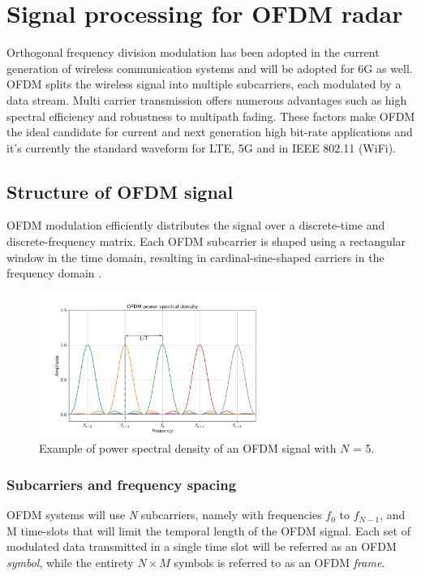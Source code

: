 \chapter{Signal processing for OFDM radar}
\label{chap:theoretical_OFDM}

Orthogonal frequency division modulation has been adopted in the current generation of wireless communication systems and will be adopted for 6G as well.
OFDM splits the wireless signal into multiple subcarriers, each modulated by a data stream. Multi carrier transmission offers numerous advantages such as high spectral efficiency and robustness to multipath fading. These factors make OFDM the ideal candidate for current and next generation high bit-rate applications and it's currently the standard waveform for LTE, 5G and in IEEE 802.11 (WiFi).

\section{Structure of OFDM signal}

OFDM modulation efficiently distributes the signal over a discrete-time and discrete-frequency matrix. Each OFDM subcarrier is shaped using a rectangular window in the time domain, resulting in cardinal-sine-shaped carriers in the frequency domain \cite{Schaich_Wild_2014}.

\begin{figure}[H]
    \centering
    \includegraphics[width=0.7\textwidth]{Images/theoretical/ofdm/ofdm_psd_mod.png}
    \caption{Example of power spectral density of an OFDM signal with $N$ = 5.}
    \label{fig:quadtree}
\end{figure}

\subsection{Subcarriers and frequency spacing}
OFDM systems will use \textit{N} subcarriers, namely with frequencies $f_0$ to $f_{N-1}$, and M time-slots that will limit the temporal length of the OFDM signal.
Each set of modulated data transmitted in a single time slot will be referred as an OFDM \textit{symbol}, while the entirety $N\times M$ symbols is referred to as an OFDM \textit{frame}.


